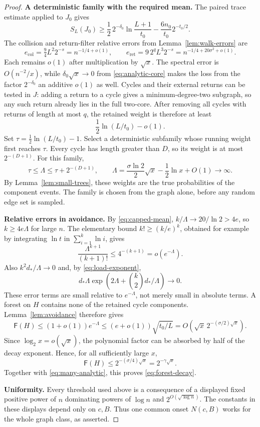 \documentclass[11pt,a4paper]{article}
\numberwithin{equation}{section}
\theoremstyle{definition}
\theoremstyle{remark}
\newcommand{\Fav}{\mathsf F}
\newcommand{\proofstep}[1]{\par\addvspace{\medskipamount}\noindent\textbf{#1}\enspace\ignorespaces}
\begin{document}
\begin{proof}
\proofstep{A deterministic family with the required mean.}
The paired trace estimate applied to $J_0$ gives
\[
 S_L(J_0)\ge \frac12\,2^{-\delta_0}\ln\frac{L+1}{t_0}
                 -\frac{6n_0}{t_0}2^{-t_0/2}.
\]
The collision and return-filter relative errors from Lemma~\ref{lem:walk-errors} are
\[
 e_{\mathrm{col}}=\tfrac94L^2 2^{-s}=n^{-1/4+o(1)},\qquad
 e_{\mathrm{ret}}=9\,2^qL^3 2^{-s}=n^{-1/4+20\sigma^2+o(1)}.
\]
Each remains $o(1)$ after multiplication by $\sqrt x$. The spectral error is $O(n^{-2}/x)$, while $\delta_0\sqrt x\to0$ from \eqref{eq:analytic-core} makes the loss from the factor $2^{-\delta_0}$ an additive $o(1)$ as well. Cycles and their external returns can be tested in $J$: adding a return to a cycle gives a minimum-degree-two subgraph, so any such return already lies in the full two-core. After removing all cycles with returns of length at most $q$, the retained weight is therefore at least
\[
 \frac12\ln(L/t_0)-o(1).
\]
Set $\tau=\frac12\ln(L/t_0)-1$. Select a deterministic subfamily whose running weight first reaches $\tau$. Every cycle has length greater than $D$, so its weight is at most $2^{-(D+1)}$. For this family,
\begin{equation}\label{eq:capped-mean}
 \tau\le\Lambda\le\tau+2^{-(D+1)},\qquad
 \Lambda=\frac{\sigma\ln2}{2}\sqrt x-\frac12\ln x+O(1)\longrightarrow\infty.
\end{equation}
By Lemma~\ref{lem:small-trees}, these weights are the true probabilities of the component events. The family is chosen from the graph alone, before any random edge set is sampled.

\proofstep{Relative errors in avoidance.}
By \eqref{eq:capped-mean}, $k/\Lambda\to20/\ln2>4e$, so $k\ge4e\Lambda$ for large $n$. The elementary bound $k!\ge(k/e)^k$, obtained for example by integrating $\ln t$ in $\sum_{i=1}^k\ln i$, gives
\[
 \frac{\Lambda^{k+1}}{(k+1)!}\le4^{-(k+1)}=o(e^{-\Lambda}).
\]
Also $k^2d_*/\Lambda\to0$ and, by \eqref{eq:load-exponent},
\[
 d_*\Lambda\exp\left(2\Lambda+\binom k2d_*/\Lambda\right)\longrightarrow0.
\]
These error terms are small relative to $e^{-\Lambda}$, not merely small in absolute terms. A forest on $H$ contains none of the retained cycle components. Lemma~\ref{lem:avoidance} therefore gives
\[
 \Fav(H)\le(1+o(1))e^{-\Lambda}
       \le(e+o(1))\sqrt{t_0/L}
       =O\!\left(\sqrt x\,2^{-(\sigma/2)\sqrt x}\right).
\]
Since $\log_2x=o(\sqrt x)$, the polynomial factor can be absorbed by half of the decay exponent. Hence, for all sufficiently large $x$,
\[
 \Fav(H)\le2^{-(\sigma/4)\sqrt x}=2^{-\gamma\sqrt x}.
\]
Together with \eqref{eq:many-analytic}, this proves \eqref{eq:forest-decay}.

\proofstep{Uniformity.}
Every threshold used above is a consequence of a displayed fixed positive power of $n$ dominating powers of $\log n$ and $2^{O(\sqrt{\log n})}$. The constants in these displays depend only on $c,B$. Thus one common onset $N(c,B)$ works for the whole graph class, as asserted.
\end{proof}
\end{document}
